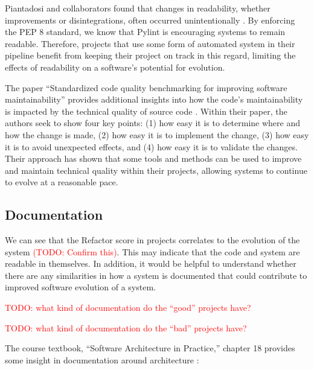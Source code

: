 \documentclass[12pt,conference]{IEEEtran}
\newcommand\todo[1]{\textcolor{red}{#1}}
\begin{document}
Piantadosi and collaborators found that changes in readability, whether improvements or disintegrations, often occurred unintentionally \cite{piantadosi:2020}. By enforcing the PEP 8 standard, we know that Pylint is encouraging systems to remain readable. Therefore, projects that use some form of automated system in their pipeline benefit from keeping their project on track in this regard, limiting the effects of readability on a software's potential for evolution.

The paper ``Standardized code quality benchmarking for improving software maintainability'' provides additional insights into how the code's maintainability is impacted by the technical quality of source code \cite{baggen:2012}. Within their paper, the authors seek to show four key points: (1) how easy it is to determine where and how the change is made, (2) how easy it is to implement the change, (3) how easy it is to avoid unexpected effects, and (4) how easy it is to validate the changes. Their approach has shown that some tools and methods can be used to improve and maintain technical quality within their projects, allowing systems to continue to evolve at a reasonable pace.

\subsection{Documentation} \label{sectionDocumentation}


We can see that the Refactor score in projects correlates to the evolution of the system \todo{(TODO: Confirm this)}. This may indicate that the code and system are readable in themselves. In addition, it would be helpful to understand whether there are any similarities in how a system is documented that could contribute to improved software evolution of a system.

\todo{TODO: what kind of documentation do the ``good'' projects have?}

\todo{TODO: what kind of documentation do the ``bad'' projects have?}


The course textbook, ``Software Architecture in Practice,'' chapter 18 provides some insight in documentation around architecture \cite{book:software-architecture-in-practice}:
\end{document}
